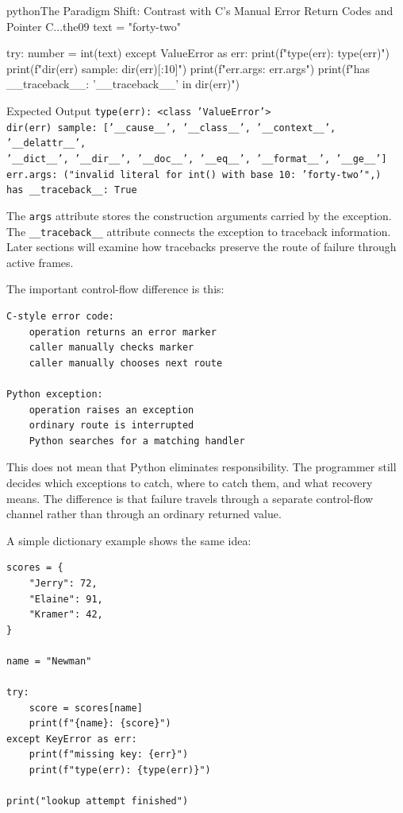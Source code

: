 \begin{codebox}[]{python}{The Paradigm Shift: Contrast with C's Manual Error Return Codes and Pointer C...}{the09}
text = "forty-two"

try:
    number = int(text)
except ValueError as err:
    print(f"type(err): {type(err)}")
    print(f"dir(err) sample: {dir(err)[:10]}")
    print(f"err.args: {err.args}")
    print(f"has __traceback__: {'__traceback__' in dir(err)}")
\end{codebox}


\begin{iobox}{Expected Output}
\texttt{type(err): <class 'ValueError'>} \\
\texttt{dir(err) sample: ['\_\_cause\_\_', '\_\_class\_\_', '\_\_context\_\_', '\_\_delattr\_\_',} \\
\texttt{'\_\_dict\_\_', '\_\_dir\_\_', '\_\_doc\_\_', '\_\_eq\_\_', '\_\_format\_\_', '\_\_ge\_\_']} \\
\texttt{err.args: ("invalid literal for int() with base 10: 'forty-two'",)} \\
\texttt{has \_\_traceback\_\_: True} \\
\end{iobox}


The \texttt{args} attribute stores the construction arguments carried by the exception. The \texttt{\_\_traceback\_\_} attribute connects the exception to traceback information. Later sections will examine how tracebacks preserve the route of failure through active frames.

The important control-flow difference is this:

\begin{verbatim}
C-style error code:
    operation returns an error marker
    caller manually checks marker
    caller manually chooses next route

Python exception:
    operation raises an exception
    ordinary route is interrupted
    Python searches for a matching handler
\end{verbatim}

This does not mean that Python eliminates responsibility. The programmer still decides which exceptions to catch, where to catch them, and what recovery means. The difference is that failure travels through a separate control-flow channel rather than through an ordinary returned value.

A simple dictionary example shows the same idea:

\begin{verbatim}
scores = {
    "Jerry": 72,
    "Elaine": 91,
    "Kramer": 42,
}

name = "Newman"

try:
    score = scores[name]
    print(f"{name}: {score}")
except KeyError as err:
    print(f"missing key: {err}")
    print(f"type(err): {type(err)}")

print("lookup attempt finished")
\end{verbatim}

